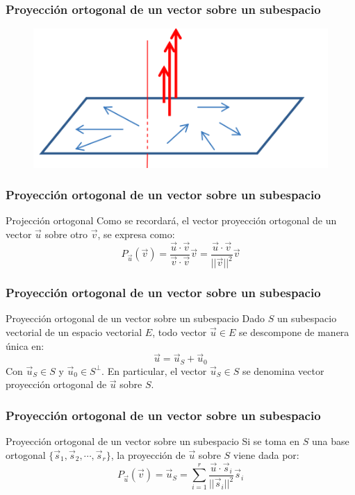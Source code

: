 \documentclass{beamer}
\begin{document}
\begin{frame}
  \frametitle{Proyecci\'on ortogonal de un vector sobre un subespacio}
\begin{figure}[h]
  \label{fig:esquema}
\centering
\includegraphics[width=\textwidth]{ortogonal2}
\end{figure}
\end{frame}





\begin{frame}
  \frametitle{Proyecci\'on ortogonal de un vector sobre un subespacio}
\begin{block}{Projecci\'on ortogonal }
Como se recordar\'a, el vector proyecci\'on ortogonal de un vector $\vec u$ sobre otro $\vec v$, se expresa como:
\[P_{\vec u}(\vec v) = \frac{\vec u\cdot \vec v}{\vec v\cdot \vec v}\vec v = \frac{\vec u \cdot \vec v}{||\vec v||^2}\vec v\]
\end{block}
\end{frame}


\begin{frame}
  \frametitle{Proyecci\'on ortogonal de un vector sobre un subespacio}
\begin{block}{Proyecci\'on ortogonal de un vector sobre un subespacio}
Dado $S$ un subespacio vectorial de un espacio vectorial $E$, todo vector $\vec u\in E$  se descompone de manera \'unica en: 
\[\vec u = \vec u_S+\vec u_0\]
Con $\vec u_S \in S$ y $\vec u_0\in S^\perp$. En particular, el vector $\vec u_S\in S$ se denomina vector proyecci\'on ortogonal de $\vec u$ sobre $S$.
\end{block}
\end{frame}




\begin{frame}
  \frametitle{Proyecci\'on ortogonal de un vector sobre un subespacio}
\begin{block}{Proyecci\'on ortogonal de un vector sobre un subespacio}
Si se toma en $S$ una base ortogonal $\{\vec s_1,\vec s_2,\cdots,\vec s_r\}$, la proyecci\'on de $\vec u$ sobre $S$ viene dada por:
\[P_{\vec u}(\vec v) = \vec u_S = \sum_{i=1}^r \frac{\vec u \cdot \vec s_i}{||\vec s_i||^2}\vec s_i\]
\end{block}
\end{frame}

\end{document}
